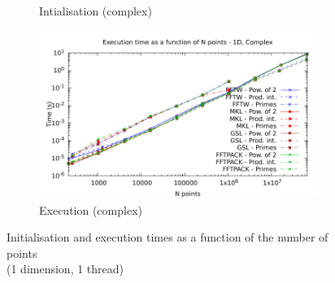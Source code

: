 \documentclass[12pt, a4paper]{article}
\begin{document}
\begin{figure}[H]
\begin{subfigure}{.5\textwidth}
\caption{Intialisation (complex)}
\label{1DCI}
\end{subfigure}%
\begin{subfigure}{.5\textwidth}
\centering
\includegraphics[width=.9\linewidth]{graphs/1d-exec-c.pdf}
\caption{Execution (complex)}
\label{1DC}
\end{subfigure}
\caption{Initialisation and execution times as a function of the number of points\\(1 dimension, 1 thread)}
\label{1D}
\end{figure}
\end{document}
